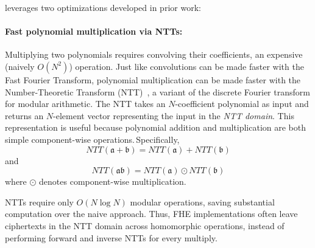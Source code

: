 \name leverages two optimizations developed in prior work:

\paragraph{Fast polynomial multiplication via NTTs:}
Multiplying two polynomials requires convolving their coefficients, an
expensive (naively $O(N^2)$) operation.
Just like convolutions can be made faster with the Fast Fourier Transform,
polynomial multiplication can be made faster with the Number-Theoretic Transform (NTT)~\cite{moenck1976practical},  %
a variant of the discrete Fourier transform for modular arithmetic.
The NTT takes an $N$\hyp{}coefficient polynomial as input and returns an $N$\hyp{}element vector representing the input in the
\textit{NTT domain}. This representation is useful because polynomial addition and multiplication are both simple component-wise operations.\,Specifically,
\begin{equation*}
NTT(\mathfrak{a}+\mathfrak{b}) = NTT(\mathfrak{a}) + NTT(\mathfrak{b}) 
\end{equation*}
and 
\begin{equation*}
NTT(\mathfrak{a}\mathfrak{b}) = NTT(\mathfrak{a}) \odot NTT(\mathfrak{b})
\end{equation*}
where $\odot$ denotes component-wise multiplication.

NTTs require only $O(N \log N)$ modular operations, saving substantial computation over the naive approach.
Thus, FHE implementations often leave ciphertexts in the NTT domain
across homomorphic operations, instead of performing forward and inverse NTTs for every multiply.

